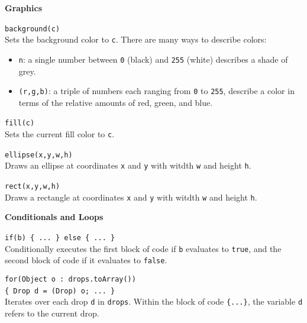\documentclass[10pt,twocolumn]{article}
\begin{document}
\noindent\textbf{Graphics}
\begin{description}
\item{\texttt{background(c)}}\ \\[.25em]
%
Sets the background color to \texttt{c}. There are many ways to describe colors: 
\begin{itemize}
\item \texttt{n}: a single number between \texttt{0} (black) and \texttt{255} (white) describes a shade of grey. 
\item \texttt{(r,g,b)}: a triple of numbers each ranging from
  \texttt{0} to \texttt{255}, describe a color in terms of the
  relative amounts of red, green, and blue.
\end{itemize}

\item{\texttt{fill(c)}}\ \\[.25em]
Sets the current fill color to \texttt{c}. 

\item{\texttt{ellipse(x,y,w,h)}}\ \\[.25em]
Draws an ellipse at coordinates \texttt{x} and \texttt{y} with witdth \texttt{w} and height \texttt{h}. 

\item{\texttt{rect(x,y,w,h)}}\ \\[.25em]
Draws a rectangle at coordinates \texttt{x} and \texttt{y} with witdth \texttt{w} and height \texttt{h}. 
\end{description}

\bigskip

\noindent\textbf{\large Conditionals and Loops}
\begin{description}

\item{\texttt{if(b) \{ ... \} else \{ ... \}}}\ \\[.25em] 
% 
Conditionally executes the first block of code if \texttt{b} evaluates to
\texttt{true}, and the second block of code if it evaluates to \texttt{false}.

\item{\texttt{for(Object o : drops.toArray()) \\ \{ Drop d = (Drop) o; ... \}}} \ \\[.25em]
%
  Iterates over each drop \texttt{d} in \texttt{drops}. Within
  the block of code \texttt{\{...\}}, the variable
  \texttt{d} refers to the current drop.
\end{description}
\end{document}
